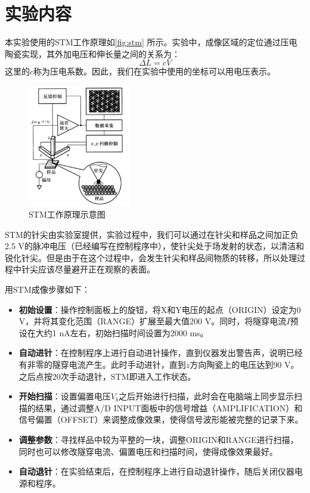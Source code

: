 \documentclass[font=default]{mpltx}
\begin{document}
\section{实验内容}
本实验使用的STM工作原理如\autoref{fig:stm} 所示。实验中，成像区域的定位通过压电陶瓷实现，其外加电压和伸长量之间的关系为：
\begin{equation}
  \Delta L = cV
\end{equation}
这里的$c$称为压电系数。因此，我们在实验中使用的坐标可以用电压表示。
\begin{figure}
  \centering
  \includegraphics[width=0.4\textwidth]{fig/stm.png}
  \caption{STM工作原理示意图}
  \label{fig:stm}
\end{figure}

STM的针尖由实验室提供，实验过程中，我们可以通过在针尖和样品之间加正负2.5 V的脉冲电压（已经编写在控制程序中），使针尖处于场发射的状态，以清洁和锐化针尖。但是由于在这个过程中，会发生针尖和样品间物质的转移，所以处理过程中针尖应该尽量避开正在观察的表面。

用STM成像步骤如下：
\begin{itemize}
  \item \textbf{初始设置}：操作控制面板上的旋钮，将X和Y电压的起点（ORIGIN）设定为0 V，并将其变化范围（RANGE）扩展至最大值200 V。同时，将隧穿电流$I$预设在大约1 nA左右，初始扫描时间设置为2000 ms。
  \item \textbf{自动进针}：在控制程序上进行自动进针操作，直到仪器发出警告声，说明已经有非零的隧穿电流产生。此时手动进针，直到$z$方向陶瓷上的电压达到90 V。之后点按20次手动退针，STM即进入工作状态。
  \item \textbf{开始扫描}：设置偏置电压$V_b$之后开始进行扫描，此时会在电脑端上同步显示扫描的结果，通过调整A/D INPUT面板中的信号增益（AMPLIFICATION）和信号偏置（OFFSET）来调整成像效果，使得信号波形能被完整的记录下来。
  \item \textbf{调整参数}：寻找样品中较为平整的一块，调整ORIGIN和RANGE进行扫描，同时也可以修改隧穿电流、偏置电压和扫描时间，使得成像效果最好。
  \item \textbf{自动退针}：在实验结束后，在控制程序上进行自动退针操作，随后关闭仪器电源和程序。
\end{itemize}
\end{document}
